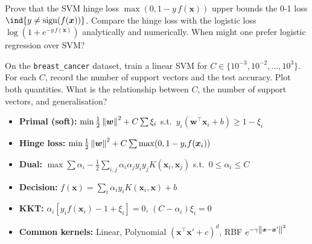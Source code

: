 \begin{exercise}
Prove that the SVM hinge loss $\max(0, 1-y\,f(\bm{x}))$ upper bounds the 0-1 loss $\ind\{y \neq \sign(f(\bm{x}))\}$. Compare the hinge loss with the logistic loss $\log(1+e^{-y\,f(\bm{x})})$ analytically and numerically. When might one prefer logistic regression over SVM?
\end{exercise}

\begin{exercise}
On the \texttt{breast\_cancer} dataset, train a linear SVM for $C \in \{10^{-3}, 10^{-2}, \ldots, 10^3\}$. For each $C$, record the number of support vectors and the test accuracy. Plot both quantities. What is the relationship between $C$, the number of support vectors, and generalisation?
\end{exercise}

\begin{keyformulas}[title=\textbf{Chapter 5 Summary}]
\begin{itemize}
    \item \textbf{Primal (soft):} $\min \frac{1}{2}\left\| \bm{w} \right\|^2 + C\sum\xi_i$ \quad s.t.\ $y_i(\bm{w}^\top\bm{x}_i+b)\geq 1-\xi_i$
    \item \textbf{Hinge loss:} $\min \frac{1}{2}\left\| \bm{w} \right\|^2 + C\sum\max(0, 1-y_i f(\bm{x}_i))$
    \item \textbf{Dual:} $\max \sum\alpha_i - \frac{1}{2}\sum_{i,j}\alpha_i\alpha_j y_i y_j K(\bm{x}_i,\bm{x}_j)$ \quad s.t.\ $0\leq\alpha_i\leq C$
    \item \textbf{Decision:} $f(\bm{x}) = \sum_i \alpha_i y_i K(\bm{x}_i,\bm{x}) + b$
    \item \textbf{KKT:} $\alpha_i[y_i f(\bm{x}_i)-1+\xi_i]=0$, $(C-\alpha_i)\xi_i=0$
    \item \textbf{Common kernels:} Linear, Polynomial $(\bm{x}^\top\bm{x}'+c)^d$, RBF $e^{-\gamma\left\| \bm{x}-\bm{x}' \right\|^2}$
\end{itemize}
\end{keyformulas}
